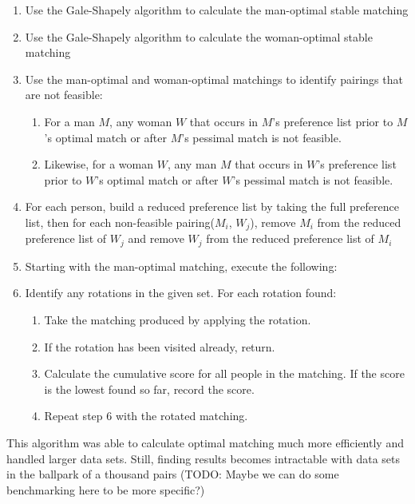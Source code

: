 \documentclass[a4paper]{article}
\begin{document}
\begin{enumerate}
    \item Use the Gale-Shapely algorithm to calculate the man-optimal stable matching
    
    \item Use the Gale-Shapely algorithm to calculate the woman-optimal stable matching
    
    \item Use the man-optimal and woman-optimal matchings to identify pairings that are not feasible:
    \begin{enumerate}
        \item For a man $M$, any woman $W$ that occurs in $M$'s preference list prior to $M$'s optimal match or after $M$'s pessimal match is not feasible.
        \item Likewise, for a woman $W$, any man $M$ that occurs in $W$'s preference list prior to $W$'s optimal match or after $W$'s pessimal match is not feasible.
    \end{enumerate}

    \item For each person, build a reduced preference list by taking the full preference list, then for each non-feasible pairing($M_i$, $W_j$), remove $M_i$ from the reduced preference list of $W_j$ and remove $W_j$ from the reduced preference list of $M_i$

    \item Starting with the man-optimal matching, execute the following:

    \item Identify any rotations in the given set. For each rotation found:
    \begin{enumerate}
        \item Take the matching produced by applying the rotation.
        \item If the rotation has been visited already, return.
        \item Calculate the cumulative score for all people in the matching. If the score is the lowest found so far, record the score.
        \item Repeat step 6 with the rotated matching.
    \end{enumerate}
\end{enumerate}

This algorithm was able to calculate optimal matching much more efficiently and handled larger data sets. Still, finding results becomes intractable with data sets in the ballpark of a thousand pairs (TODO: Maybe we can do some benchmarking here to be more specific?)
\end{document}
